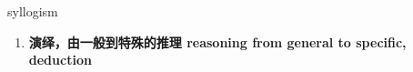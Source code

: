 
\begin{frame}
{\huge syllogism}
\begin{center}
\begin{enumerate}\Large
  \item \textbf{演绎，由一般到特殊的推理 reasoning from general to specific, deduction}
\end{enumerate}
\end{center}
\end{frame}
